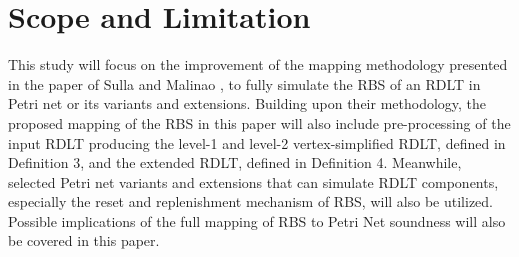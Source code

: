 \section{Scope and Limitation}
This study will focus on the improvement of the mapping methodology presented in the paper of Sulla and Malinao \cite{sulla-malinao}, to fully simulate the RBS of an RDLT in Petri net or its variants and extensions. Building upon their methodology, the proposed mapping of the RBS in this paper will also include pre-processing of the input RDLT producing the level-1 and level-2 vertex-simplified RDLT, defined in Definition 3, and the extended RDLT, defined in Definition 4. Meanwhile, selected Petri net variants and extensions that can simulate RDLT components, especially the reset and replenishment mechanism of RBS, will also be utilized. Possible implications of the full mapping of RBS to Petri Net soundness will also be covered in this paper.

